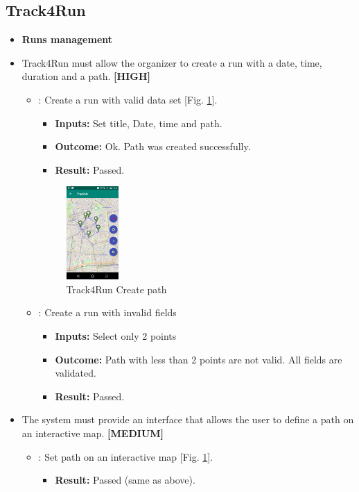 \documentclass[a4paper, hidelinks, 12pt]{report}
\newcommand\requirement[1]{\item[{[REQ-#1]}] }
\newcommand\test[1]{\item[{[TEST-#1]}] }
\begin{document}
	\subsection{Track4Run}
	
	\begin{itemize}
	\item \textbf{Runs management}
	\requirement{24} Track4Run must allow the organizer to create a run with a date, time, duration and a path. \textbf{[HIGH]}
					\begin{itemize}
		\test{14}: Create a run with valid data set [Fig. \ref{fig:run_path}].
			\begin{itemize}
			\item \textbf{Inputs: } Set title, Date, time and path.			
			\item \textbf{Outcome: } Ok. Path was created successfully.
			\item \textbf{Result: } Passed. 
			\end{itemize}			
			
		\begin{figure}[H]
					\centering
				\includegraphics[width=0.2\textwidth]{images/define_path.jpeg}
					\caption[Track4Run Create path]{Track4Run Create path}
				\label{fig:run_path}
			\end{figure}
			
		\test{15} : Create a run with invalid fields
			\begin{itemize}
			\item \textbf{Inputs: }Select only 2 points
			\item \textbf{Outcome: }Path with less than 2 points are not valid. All fields are validated.
			\item \textbf{Result: } Passed. 
			 \end{itemize}	
	\end{itemize}
	\requirement{25} The system must provide an interface that allows the user to define a path on an interactive map. \textbf{[MEDIUM]}
						\begin{itemize}
		\test{16}: Set path on an interactive map [Fig. \ref{fig:run_path}].
			\begin{itemize}
			\item \textbf{Result: } Passed (same as above). 
			\end{itemize}
	

\end{itemize}
\end{itemize}
\end{document}
